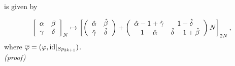 \documentclass[12pt]{iopart}
\begin{document}
is given by

\begin{equation}
\left[\begin{array}{cc}
\alpha & \beta \\\relax
\gamma & \delta \\
\end{array}\right]_N
\mapsto
\left[
\left(\begin{array}{cc}
\hat\alpha & \hat\beta \\
\hat\gamma & \hat\delta \\
\end{array}\right)
+
\left(\begin{array}{cc}
\hat\alpha-1+\hat\gamma & 1-\hat\delta \\
1-\hat\alpha & \hat\delta-1+\hat\beta \\
\end{array}\right)N
\right]_{2N},
\end{equation}
where \(\overline\varphi=(\varphi,{\rm id}|_{Sp_{2k+1}})\).
\\

\noindent
{\it (proof)}
 
\end{document}
